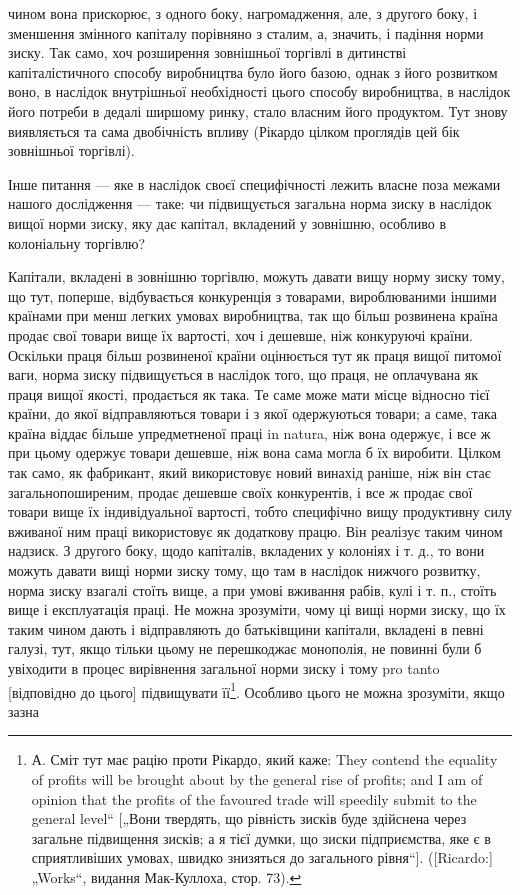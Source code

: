 чином вона прискорює, з одного боку, нагромадження, але, з другого боку, і зменшення змінного
капіталу порівняно з сталим, а, значить, і падіння норми зиску. Так само, хоч розширення зовнішньої
торгівлі в дитинстві капіталістичного способу виробництва було його базою, однак з його розвитком
воно, в наслідок внутрішньої необхідності цього способу виробництва, в наслідок його потреби в
дедалі ширшому ринку, стало власним його продуктом. Тут знову виявляється та сама двобічність впливу
(Рікардо цілком проглядів цей бік зовнішньої торгівлі).

Інше питання — яке в наслідок своєї специфічності лежить власне поза межами нашого дослідження —
таке: чи підвищується загальна норма зиску в наслідок вищої норми зиску, яку дає капітал, вкладений
у зовнішню, особливо в колоніальну торгівлю?

Капітали, вкладені в зовнішню торгівлю, можуть давати вищу норму зиску тому, що тут, поперше,
відбувається конкуренція з товарами, вироблюваними іншими країнами при менш легких умовах
виробництва, так що більш розвинена країна продає свої
товари вище їх вартості, хоч і дешевше, ніж конкуруючі країни. Оскільки праця більш розвиненої
країни оцінюється тут як праця вищої питомої ваги, норма зиску підвищується в наслідок того, що
праця, не оплачувана як праця вищої якості, продається як така. Те саме може мати місце відносно
тієї країни, до якої відправляються товари і з якої одержуються товари; а саме, така країна віддає
більше упредметненої праці in natura, ніж вона одержує, і все ж при цьому одержує товари дешевше,
ніж вона сама могла б їх виробити. Цілком так само, як фабрикант,
який використовує новий винахід раніше, ніж він стає загальнопоширеним, продає дешевше своїх
конкурентів, і все ж продає свої товари вище їх індивідуальної вартості, тобто специфічно вищу
продуктивну силу вживаної ним праці використовує як додаткову працю. Він реалізує таким чином
надзиск. З другого боку, щодо капіталів, вкладених у колоніях і т. д., то вони можуть давати вищі
норми зиску тому, що там в наслідок нижчого розвитку, норма зиску взагалі стоїть вище, а при умові
вживання рабів, кулі і т. п., стоїть вище і експлуатація праці. Не можна зрозуміти, чому ці вищі
норми зиску, що їх таким чином дають і відправляють до батьківщини капітали, вкладені в певні
галузі, тут, якщо тільки цьому не перешкоджає монополія, не повинні були б увіходити в процес
вирівнення загальної норми зиску і тому pro tanto [відповідно до цього] підвищувати її\footnote{
А. Сміт тут має рацію проти Рікардо, який каже: They contend the equality of profits will be
brought about by the general rise of profits; and I am of opinion that the profits of the favoured
trade will speedily submit to the general level“ [„Вони твердять, що рівність зисків буде здійснена
через загальне підвищення зисків; а я тієї думки, що зиски підприємства, яке є в сприятливіших
умовах, швидко знизяться до загального рівня“]. ([Ricardo:] „Works“, видання Мак-Куллоха, стор. 73).
}. Особливо
цього не можна зрозуміти, якщо зазна